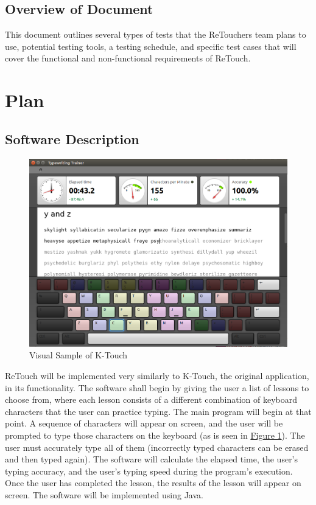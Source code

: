 \documentclass[12pt, titlepage]{article}
\begin{document}
\subsection{Overview of Document}

	This document outlines several types of tests that the ReTouchers team plans to use, potential testing tools, a testing schedule, and specific test cases that will cover the functional and non-functional requirements of ReTouch. 

\section{Plan}
	
\subsection{Software Description}

\begin{figure}[h!]
	\includegraphics[scale=0.5]{KTouchLesson.png}
	\centering
	\caption{Visual Sample of K-Touch}
	\label{figure:1}
\end{figure}

	ReTouch will be implemented very similarly to K-Touch, the original application, in its functionality. The software shall begin by giving the user a list of lessons to choose from, where each lesson consists of a different combination of keyboard characters that the user can practice typing. The main program will begin at that point. A sequence of characters will appear on screen, and the user will be prompted to type those characters on the keyboard (as is seen in \hyperref[figure:1]{Figure 1}). The user must accurately type all of them (incorrectly typed characters can be erased and then typed again). The software will calculate the elapsed time, the user's typing accuracy, and the user's typing speed during the program's execution. Once the user has completed the lesson, the results of the lesson will appear on screen. The software will be implemented using Java.
\end{document}
